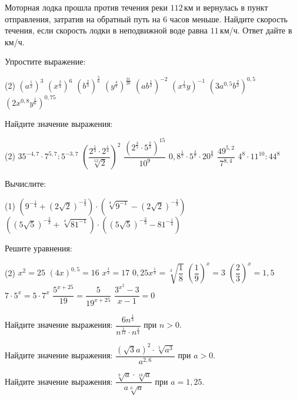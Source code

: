 \begin{class}[number=3]
\begin{listofex}
		\item Моторная лодка прошла против течения реки \(112\) км и вернулась в пункт отправления, затратив на обратный путь на \(6\) часов меньше. Найдите скорость течения, если скорость лодки в неподвижной воде равна \(11\) км/ч. Ответ дайте в км/ч.
	\end{listofex}
\end{class}

\begin{class}[number=4]
	\begin{listofex}
		\item Упростите выражение:
		\begin{tasks}(2)
			\task \( (a^{\tfrac{1}{2}})^3 \)
			\task \( (x^{\tfrac{2}{3}})^6 \)
			\task \( (b^{\tfrac{2}{3}})^{\tfrac{5}{6}} \)
			\task \( (y^{\tfrac{4}{7}})^{\tfrac{21}{20}} \)
			\task \( (ab^{\tfrac{1}{2}})^{-2} \)
			\task \( (x^{\tfrac{1}{3}}y)^{-1} \)
			\task \( (3a^{0,5}b^{\tfrac{2}{3}})^{0,5} \)
			\task \( (2x^{0,8}y^{\tfrac{1}{6}})^{0,75} \)
		\end{tasks}
		\item Найдите значение выражения:
		\begin{tasks}(2)
			\task \( 35^{-4,7} \cdot 7^{5,7} : 5^{-3,7} \)
			\task \( \left( \dfrac{2^{\tfrac{1}{3}}\cdot2^{\tfrac{1}{4}}}{\sqrt[12]{2}} \right)^2 \)
			\task \( \dfrac{(2^\tfrac{3}{5}\cdot5^{\tfrac{2}{3}})^{15}}{10^9} \)
			\task \( 0,8^{\tfrac{1}{7}}\cdot5^{\tfrac{2}{7}}\cdot20^{\tfrac{6}{7}} \)
			\task \( \dfrac{49^{5,2}}{7^{8,4}} \)
			\task \( 4^8\cdot11^{10}:44^8 \)
		\end{tasks}
		\item Вычислите:
		\begin{tasks}(1)
			\task \( ( 9^{-\tfrac{1}{4}}+(2\sqrt{2})^{-\tfrac{2}{3}} ) \cdot ( \sqrt[4]{9^{-1}} - (2\sqrt{2})^{-\tfrac{2}{3}} ) \)
			\task \( ( (5\sqrt{5})^{-\tfrac{2}{3}} + \sqrt[4]{81^{-1}} ) \cdot ( (5\sqrt{5})^{-\tfrac{2}{3}} - 81^{-\tfrac{1}{4}} ) \)
		\end{tasks}
		\item Решите уравнения:
		\begin{tasks}(2)
			\task \( x^2 = 25 \)
			\task \( (4x)^{0,5} = 16 \)
			\task \( x^{\tfrac{1}{3}} = 17 \)
			\task \( 0,25x^{\tfrac{1}{3}} = \sqrt[3]{\dfrac{1}{8}} \)
			\task \( \left( \dfrac{1}{9} \right)^x=3 \)
			\task \( \left( \dfrac{2}{3} \right)^x=1,5 \)
			\task \( 7 \cdot 5^x = 5 \cdot 7^x \)
			\task \( \dfrac{5^{x+25}}{19}=\dfrac{5}{19^{x+25}} \)
			\task \( \dfrac{3^{x^2}-3}{x-1}=0 \)
		\end{tasks}
		\item Найдите значение выражения: \( \dfrac{6n^{\tfrac{1}{3}}}{n^{\tfrac{1}{12}} \cdot n^ {\tfrac{1}{4}}} \) при \( n>0 \).
		\item Найдите значение выражения: \( \dfrac{(\sqrt{3}a)^2 \cdot \sqrt[5]{a^3}}{a^{2,6}} \) при \( a>0 \).
		\item Найдите значение выражения: \( \dfrac{\sqrt[9]{a} \cdot \sqrt[18]{a}}{a\sqrt[6]{a}} \) при \( a=1,25 \).
	\end{listofex}
\end{class}

